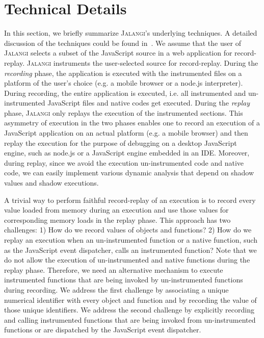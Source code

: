 \documentclass{sig-alternate}
\def\jalangi{\textsc{Jalangi}}
\begin{document}
\section{Technical Details}
\label{sec:technical-details}

In this section, we briefly summarize \jalangi{}'s underlying
techniques.  A detailed discussion of the techniques could be found
in~\cite{SBGKfse13}.  We assume that the user of \jalangi{} selects a
subset of the JavaScript source in a web application for
record-replay.  \jalangi{} instruments the user-selected source for
record-replay.  During the \emph{recording} phase, the application is
executed with the instrumented files on a platform of the user's
choice (e.g. a mobile browser or a node.js interpreter).  During
recording, the entire application is executed, i.e. all instrumented
and un-instrumented JavaScript files and native codes get executed.
During the \emph{replay} phase, \jalangi{} only replays the execution
of the instrumented sections.  This asymmetry of execution in the two
phases enables one to record an execution of a JavaScript application
on an actual platform (e.g. a mobile browser) and then replay the
execution for the purpose of debugging on a desktop JavaScript engine,
such as node.js or a JavaScript engine embedded in an IDE.  Moreover,
during replay, since we avoid the execution un-instrumented code and
native code, we can easily implement various dynamic analysis that
depend on shadow values and shadow executions.

A trivial way to perform faithful record-replay of an execution is to
record every value loaded from memory during an execution and use
those values for corresponding memory loads in the replay phase.  This
approach has two challenges: 1) How do we record values of objects and
functions?  2) How do we replay an execution when an un-instrumented
function or a native function, such as the JavaScript event
dispatcher, calls an instrumented function?  Note that we do not allow
the execution of un-instrumented and native functions during the
replay phase.  Therefore, we need an alternative mechanism to execute
instrumented functions that are being invoked by un-instrumented
functions during recording.  We address the first challenge by
associating a unique numerical identifier with every object and
function and by recording the value of those unique identifiers.  We
address the second challenge by explicitly recording and calling
instrumented functions that are being invoked from un-instrumented
functions or are dispatched by the JavaScript event dispatcher.
\end{document}
